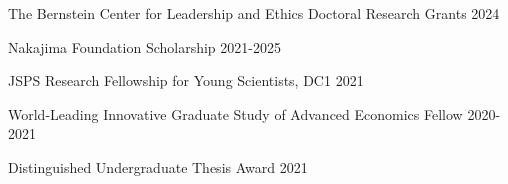 

\begin{cventries}

\cventrysimple
    {The Bernstein Center for Leadership and Ethics Doctoral Research Grants}  %
    {2024} %
    {}
	
\cventrysimple
    {Nakajima Foundation Scholarship}  %
    {2021-2025} %
    {}
	
\cventrysimple
	{JSPS Research Fellowship for Young Scientists, DC1}  %
    {2021} %
    {}

\cventrysimple
	{World-Leading Innovative Graduate Study of Advanced Economics Fellow}  %
    {2020-2021} %
    {}

\cventrysimple
    {Distinguished Undergraduate Thesis Award}  %
    {2021} %
    {}


\end{cventries}
